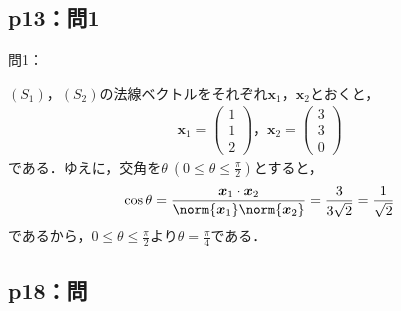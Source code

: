 \documentclass[uplatex,dvipdfmx,a4paper,10pt,fleqn]{jsarticle}
\begin{document}
\subsection*{p13：問1}
%
問1：
\begin{tleftbar}
    $(S_1)$，$(S_2)$の法線ベクトルをそれぞれ$\bm{x}_1$，$\bm{x}_2$とおくと，
    \begin{gather*}
        \bm{x}_1 =
            \begin{pmatrix}
                1\\
                1\\
                2
            \end{pmatrix}
        ，
        \bm{x}_2 =
            \begin{pmatrix}
                3\\
                3\\
                0
            \end{pmatrix}
        \end{gather*}
        である．ゆえに，交角を$\theta ~(0 \le \theta \le \frac{\pi}{2})$とすると，
        \[
            \cos \theta = \frac{\bm{x}_1 \cdot \bm{x}_2}{\norm{\bm{x}_1} \norm{\bm{x}_2}}=\frac{3}{3\sqrt{2}}=\frac{1}{\sqrt{2}}
        \]
        であるから，$0 \le \theta \le \frac{\pi}{2}$より$\theta =\frac{\pi}{4}$である．
    \end{tleftbar}
%
%
\newpage
%
%
%
\subsection*{p18：問}
\end{document}
